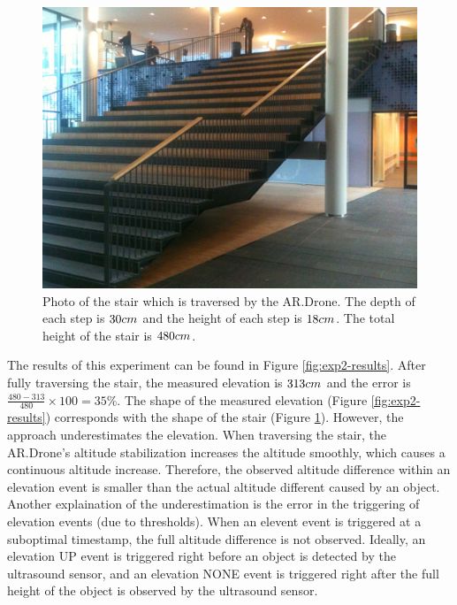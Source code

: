 \begin{figure}[htb!]
\centering
\includegraphics[width=0.5\linewidth]{images/exp2-stair-photo.jpg}
\caption{Photo of the stair which is traversed by the AR.Drone. The depth of each step is $30\small{cm}$ and the height of each step is $18\small{cm}$. The total height of the stair is $480\small{cm}$.}
\label{fig:exp2-stair-photo}
\end{figure}

The results of this experiment can be found in Figure \ref{fig:exp2-results}.
After fully traversing the stair, the measured elevation is $313\begin{small}cm\end{small}$ and the error is $\frac{480 - 313}{480} \times 100 = 35\%$.
The shape of the measured elevation (Figure \ref{fig:exp2-results}) corresponds with the shape of the stair (Figure \ref{fig:exp2-stair-photo}).
However, the approach underestimates the elevation.
When traversing the stair, the AR.Drone's altitude stabilization increases the altitude smoothly, which causes a continuous altitude increase.
Therefore, the observed altitude difference within an elevation event is smaller than the actual altitude different caused by an object.
Another explaination of the underestimation is the error in the triggering of elevation events (due to thresholds).
When an elevent event is triggered at a suboptimal timestamp, the full altitude difference is not observed.
Ideally, an elevation UP event is triggered right before an object is detected by the ultrasound sensor, and an elevation NONE event is triggered right after the full height of the object is observed by the ultrasound sensor.


